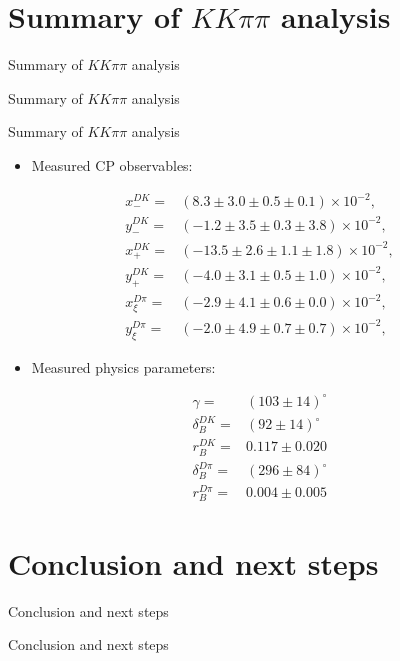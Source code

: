 \documentclass{beamer}
\begin{document}
\section{Summary of $KK\pi\pi$ analysis}
\begin{frame}{Summary of $KK\pi\pi$ analysis}
  \begin{center}
    {\huge Summary of $KK\pi\pi$ analysis}
  \end{center}
\end{frame}

\begin{frame}{Summary of $KK\pi\pi$ analysis}
  \begin{itemize}
    \item{Measured CP observables:}
  \end{itemize}
  \vspace{-0.2cm}
  \begin{align*}
    x_-^{DK} =& (8.3 \pm 3.0 \pm 0.5 \pm 0.1)\times 10^{-2}, \\
    y_-^{DK} =& (-1.2 \pm 3.5 \pm 0.3 \pm 3.8)\times 10^{-2}, \\
    x_+^{DK} =& (-13.5 \pm 2.6 \pm 1.1 \pm 1.8)\times 10^{-2}, \\
    y_+^{DK} =& (-4.0 \pm 3.1 \pm 0.5 \pm 1.0)\times 10^{-2}, \\
    x_\xi^{D\pi} =& (-2.9 \pm 4.1 \pm 0.6 \pm 0.0)\times 10^{-2}, \\
    y_\xi^{D\pi} =& (-2.0 \pm 4.9 \pm 0.7 \pm 0.7)\times 10^{-2},
  \end{align*}
  \vspace{-0.5cm}
  \begin{itemize}
    \item{Measured physics parameters:}
  \end{itemize}
  \vspace{-0.2cm}
  \begin{align*}
    \gamma =& (103\pm14)^\circ \\
    \delta_B^{DK} =& (92\pm14)^\circ \\
    r_B^{DK} =& 0.117\pm0.020 \\
    \delta_B^{D\pi} =& (296\pm84)^\circ \\
    r_B^{D\pi} =& 0.004\pm0.005
  \end{align*}
\end{frame}

\section{Conclusion and next steps}
\begin{frame}{Conclusion and next steps}
  \begin{center}
    {\huge Conclusion and next steps}
  \end{center}
\end{frame}
\end{document}
